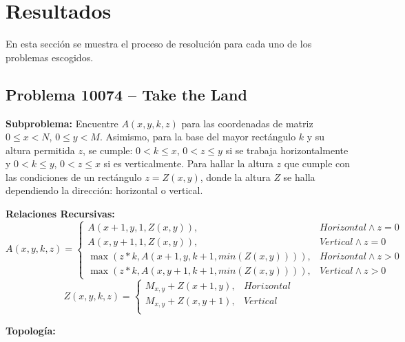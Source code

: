 \documentclass[a4paper, 12pt]{article}
\begin{document}
\section{Resultados}
\label{sc:Experim}

En esta sección se muestra el proceso de resolución para cada uno de los problemas escogidos.

\subsection{Problema 10074 -- Take the Land}

\textbf{Subproblema:}
Encuentre $A(x, y, k, z)$ para las coordenadas de matriz $0\leq x < N$, $0\leq y < M$. Asimismo, para la base del mayor rectángulo $k$ y su altura permitida $z$, se cumple: $0 < k \leq x$, $0 < z \leq y$ si se trabaja horizontalmente y $0 < k \leq y$, $0 < z \leq x$ si es verticalmente. Para hallar la altura $z$ que cumple con las condiciones de un rectángulo $z = Z(x, y)$, donde la altura $Z$ se halla dependiendo la dirección: horizontal o vertical.

\textbf{Relaciones Recursivas: }\\[-3mm]
$$A(x,y,k,z)=\begin{cases}
    A(x+1,y,1,Z(x,y)),                  & Horizontal \land z = 0 \\
    A(x,y+1,1,Z(x,y)),                  & Vertical \land z = 0   \\
    \max(z*k,A(x+1,y,k+1,min(Z(x,y)))), & Horizontal \land z > 0 \\
    \max(z*k,A(x,y+1,k+1,min(Z(x,y)))), & Vertical \land z > 0
  \end{cases}$$
$$Z(x,y,k,z)=\begin{cases}
    M_{x,y} + Z(x+1,y), & Horizontal \\
    M_{x,y} + Z(x,y+1), & Vertical   \\
  \end{cases}$$

\textbf{Topología: }\\[-5mm]
\strut\hfill
{}\hfill\strut\par
\end{document}

